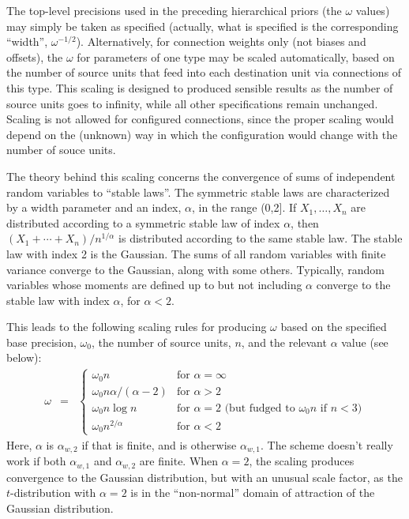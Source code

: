 \documentclass{report}[11pt]
\def\beq{\begin{eqnarray}}
\def\eeq{\end{eqnarray}}
\begin{document}
The top-level precisions used in the preceding hierarchical priors
(the $\omega$ values) may simply be taken as specified (actually, what
is specified is the corresponding ``width'', $\omega^{-1/2}$).
Alternatively, for connection weights only (not biases and offsets),
the $\omega$ for parameters of one type may be scaled automatically,
based on the number of source units that feed into each destination
unit via connections of this type.  This scaling is designed to
produced sensible results as the number of source units goes to
infinity, while all other specifications remain unchanged.  Scaling is
not allowed for configured connections, since the proper scaling would
depend on the (unknown) way in which the configuration would change
with the number of souce units.

The theory behind this scaling concerns the convergence of sums of
independent random variables to ``stable laws''.  The symmetric stable
laws are characterized by a width parameter and an index, $\alpha$, in
the range (0,2].  If $X_1,\ldots,X_n$ are distributed according to a
symmetric stable law of index $\alpha$, then
$(X_1+\cdots+X_n)/n^{1/\alpha}$ is distributed according to the same
stable law.  The stable law with index 2 is the Gaussian.  The sums of
all random variables with finite variance converge to the Gaussian,
along with some others.  Typically, random variables whose moments are
defined up to but not including $\alpha$ converge to the stable law
with index $\alpha$, for $\alpha<2$.

This leads to the following scaling rules for producing $\omega$ based 
on the specified base precision, $\omega_0$, the number of source units, $n$,
and the relevant $\alpha$ value (see below):\beq
  \omega & = & \left\{\begin{array}{ll}
     \omega_0 n                         & \mbox{for $\alpha=\infty$} \\[2pt]
     \omega_0 n \alpha / (\alpha\!-\!2) & \mbox{for $\alpha>2$} \\[2pt]
     \omega_0 n \log n                  & \mbox{for $\alpha=2$ 
        \ \ (but fudged to $\omega_0 n$ if $n<3$)} \\[2pt]
     \omega_0 n^{2/\alpha}              & \mbox{for $\alpha<2$} 
  \end{array}\right.
\eeq%
Here, $\alpha$ is $\alpha_{w,2}$ if that is finite, and is otherwise
$\alpha_{w,1}$.  The scheme doesn't really work if both $\alpha_{w,1}$
and $\alpha_{w,2}$ are finite.  When $\alpha=2$, the scaling produces
convergence to the Gaussian distribution, but with an unusual scale
factor, as the $t$-distribution with $\alpha=2$ is in the
``non-normal'' domain of attraction of the Gaussian distribution.
\end{document}
